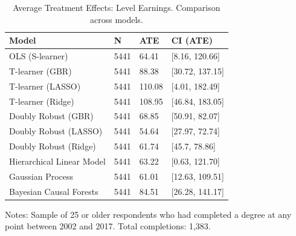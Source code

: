\documentclass[12pt, a4paper]{article}
\begin{document}
\begin{landscape}
\begin{table}[H]
\centering
\small
\caption{Average Treatment Effects: Level Earnings. Comparison across models.}
\begin{tabular}{p{} C{0.1\textwidth} C{0.1\textwidth} C{0.2\textwidth}}
\toprule
Model  &  N  &  ATE  &  CI (ATE)  \\
\midrule 	   						
OLS (S-learner)	 & 	5441	 & 	64.41	 & 	[8.16, 120.66]	 \\
T-learner (GBR)	 & 	5441	 & 	88.38	 & 	[30.72, 137.15]	 \\
T-learner (LASSO)	 & 	5441	 & 	110.08	 & 	[4.01, 182.49]	 \\
T-learner (Ridge)	 & 	5441	 & 	108.95	 & 	[46.84, 183.05]	 \\
Doubly Robust (GBR)	 & 	5441	 & 	68.85	 & [50.91, 82.07] \\
Doubly Robust (LASSO)	 & 	5441	 & 	54.64	 & 	[27.97, 72.74]	 \\
Doubly Robust (Ridge)	 & 	5441	 & 	61.74	 & 	[45.7, 78.86]	 \\
Hierarchical Linear Model	 & 	5441	 & 	63.22 & [0.63, 121.70]  \\
Gaussian Process  & 	5441	 & 	61.01	 & 	[12.63, 109.51]	 \\
Bayesian Causal Forests  & 5441 & 84.51 & [26.28, 141.17] \\
\bottomrule
\end{tabular}
\par\medskip
\parbox{1.0\textwidth}{\footnotesize Notes: Sample of 25 or older respondents who had completed a degree at any point between 2002 and 2017. Total completions: 1,383.}
\label{tab:atebslvl}
\end{table}










\end{landscape}
\end{document}
